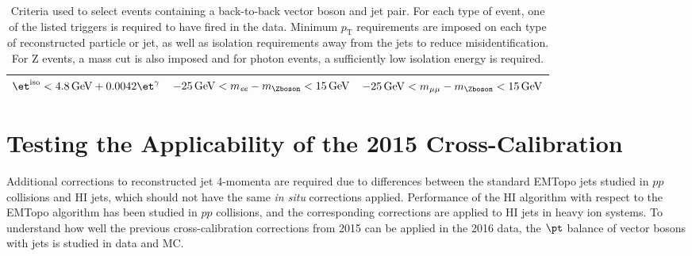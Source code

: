 \documentclass[NOTE, atlasdraft=true, texlive=2016, USenglish]{\ATLASLATEXPATH atlasdoc}
\begin{document}
\begin{center}
\begin{table}
{\begin{tabular}{| l | l | l |}
	{\small $\et^{\text{iso}} < \SI{4.8}{\GeV} + 0.0042\et^{\gamma}$}& {\small $\SI{-25}{\GeV} < m_{\textit{ee}} - m_{\Zboson} < \SI{15}{\GeV}$} & {\small $\SI{-25}{\GeV} < m_{\mu\mu} - m_{\Zboson} < \SI{15}{\GeV}$} \\ \hline
\end{tabular}
}
\caption{Criteria used to select events containing a back-to-back vector boson and jet pair. For each type of event, one of the listed triggers is required to have fired in the data. Minimum $p_{\text{T}}$ requirements are imposed on each type of reconstructed particle or jet, as well as isolation requirements away from the jets to reduce misidentification. For Z events, a mass cut is also imposed and for photon events, a sufficiently low isolation energy is required.}
\label{tab:eventSelection}
\end{table}
\end{center}
\section{Testing the Applicability of the 2015 Cross-Calibration}
\label{sec:EtaJES}

Additional corrections to reconstructed jet 4-momenta are required due to differences between the standard EMTopo jets studied in $pp$ collisions and HI jets, which should not have the same \textit{in situ} corrections applied. Performance of the HI algorithm with respect to the EMTopo algorithm has been studied in $pp$ collisions, and the corresponding corrections are applied to HI jets in heavy ion systems. To understand how well the previous cross-calibration corrections from 2015 \cite{ATL-COM-PHYS-2016-1253} can be applied in the 2016 data, the $\pt$ balance of vector bosons with jets is studied in data and MC.\par
\end{document}
